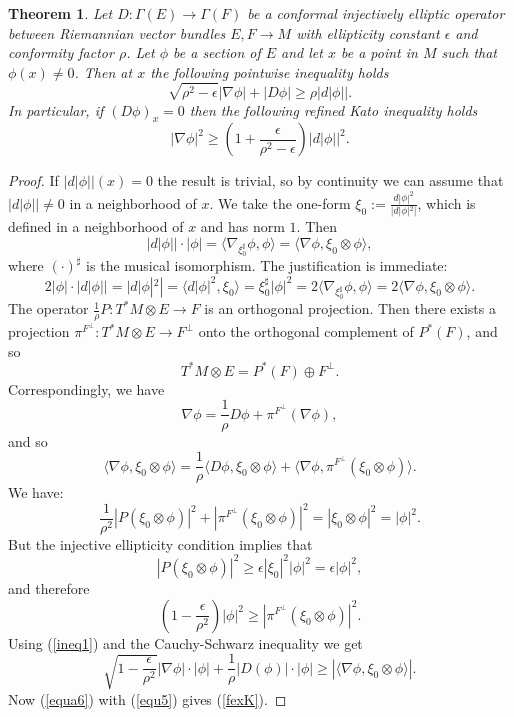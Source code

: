 \documentclass[12pt]{amsart} %
\newtheorem{theorem}{Theorem}[section]
\theoremstyle{definition}
\numberwithin{equation}{section}
\newcommand{\ra}{\rightarrow}
\begin{document}
\begin{theorem}\label{Dinjelliptic} Let $D:\Gamma(E)\ra\Gamma(F)$ be a conformal injectively elliptic operator  between Riemannian vector bundles $E,F \ra M$ with ellipticity constant $\epsilon$ and conformity factor $\rho$. Let $\phi$ be a section of $E$ and let $x$ be a point in $M$ such that $\phi(x)\neq0$. Then at $x$ the following pointwise inequality holds
\begin{equation}\label{fexK} \sqrt{\rho^ 2- \epsilon}|\nabla \phi|+ |D \phi|\geq  \rho|d|\phi||.
\end{equation}
In particular, if $(D\phi)_x=0$ then the following refined Kato inequality holds
\[|\nabla \phi|^ 2\geq \left(1+\frac{\epsilon}{\rho^2-\epsilon}\right)|d|\phi||^ 2. \]
\end{theorem}

\begin{proof}
If $|d|\phi||(x) = 0$ the result is trivial, so by continuity we can assume that $|d|\phi|| \ne 0$ in a neighborhood of $x$. We take the one-form $\xi_0:=\frac{d|\phi|^2}{|d|\phi|^2|}$, which is defined in a neighborhood of $x$ and has norm $1$. Then
\begin{equation}\label{equ5} |d|\phi||\cdot|\phi|=\langle \nabla_{\xi_0^{\sharp}}\phi,\phi\rangle=\langle \nabla \phi,\xi_0\otimes \phi \rangle ,
\end{equation}
where $(\cdot)^{\sharp}$ is the musical isomorphism. The justification is immediate:
\begin{equation}\label{mine} 2|\phi|\cdot|d|\phi||=|d|\phi|^2|=\langle d|\phi|^2,\xi_0\rangle=\xi_0^{\sharp}|\phi|^2=2\langle \nabla_{\xi_0^{\sharp}}\phi,\phi \rangle=2\langle \nabla \phi,\xi_0\otimes \phi \rangle.
\end{equation}
The operator $\frac{1}{\rho}P:T^ *M\otimes E\ra F$ is an orthogonal projection. Then there exists a projection $\pi^{F^ {\perp}}:T^ *M\otimes E\ra F^ {\perp}$ onto the orthogonal complement of $P^ *(F)$, and so
\[T^ *M\otimes E=P^ *(F)\oplus F^ {\perp}.\]
Correspondingly, we have \[\nabla \phi=\frac{1}{\rho}D\phi + \pi^{F^{\perp}} (\nabla \phi),\]
and so 
\begin{equation}\label{ineq1}\langle \nabla \phi,\xi_0\otimes \phi \rangle=\frac{1}{\rho}\langle D \phi ,\xi_0\otimes \phi\rangle+\langle \nabla \phi,\pi^{F^ {\perp}}(\xi_0\otimes \phi)\rangle.\end{equation}
We have:
\[\frac{1}{\rho^ 2}|P(\xi_0\otimes \phi)|^ 2+|\pi^ {F^ {\perp}}(\xi_0\otimes \phi)|^ 2=|\xi_0\otimes \phi|^ 2=|\phi|^ 2.\]
But the injective ellipticity condition implies that
\[|P(\xi_0\otimes \phi)|^ 2\geq \epsilon |\xi_0|^ 2|\phi|^ 2=\epsilon|\phi|^2, \]
and therefore
\[ \left(1-\frac{\epsilon}{\rho^ 2}\right)|\phi|^2 \geq |\pi^ {F^ {\perp}}(\xi_0\otimes \phi)|^2.\]
Using (\ref{ineq1}) and the Cauchy-Schwarz inequality we get
\begin{equation}\label{equa6}  \sqrt{1-\frac{\epsilon}{\rho^ 2}}|\nabla \phi|\cdot|\phi|+\frac{1}{\rho}|D(\phi)|\cdot|\phi|\geq |\langle \nabla \phi,\xi_0\otimes \phi \rangle|.\end{equation}
Now (\ref{equa6}) with (\ref{equ5}) gives (\ref{fexK}).
\end{proof}
\end{document}
